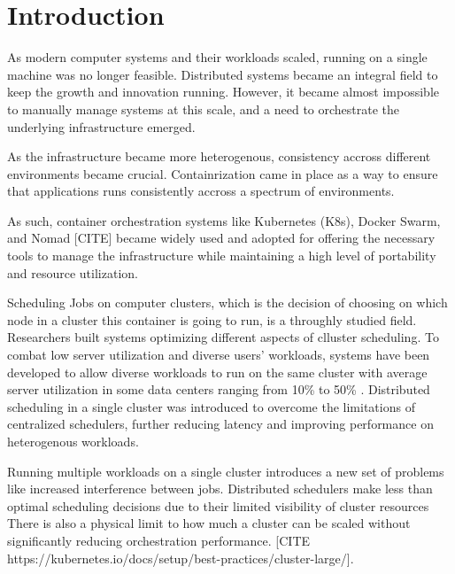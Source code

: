 
\chapter{Introduction}

As modern computer systems and their workloads scaled, running on a single
machine was no longer feasible. Distributed systems became an integral field to
keep the growth and innovation running. However, it became almost impossible to
manually manage systems at this scale, and a need to orchestrate the underlying
infrastructure emerged. 

As the infrastructure became more heterogenous, consistency accross different
environments became crucial. Containrization came in place as a way to ensure
that applications runs consistently accross a spectrum of environments. 

As such, container orchestration systems like Kubernetes (K8s), Docker Swarm,
and Nomad [CITE] became widely used and adopted for offering the necessary
tools to manage the infrastructure while maintaining a high level of portability
and resource utilization. 

Scheduling Jobs on computer clusters, which is the decision of choosing on
which node in a cluster this container is going to run, is a throughly studied
field. Researchers built systems optimizing different aspects of clluster
scheduling. To combat low server utilization and diverse users' workloads,
systems have been developed to allow diverse workloads to run on the same
cluster \cite{bhattacharya_hierarchical_2013, hindman_mesos_nodate} with
average server utilization in some data centers ranging from 10\% to 50\%
\cite{lo_heracles_2015}. Distributed scheduling in a single cluster was
introduced to overcome the limitations of centralized schedulers, further
reducing latency and improving performance on heterogenous workloads. 

Running multiple workloads on a single cluster introduces a new set of problems
like increased interference between jobs. 
Distributed schedulers make less than optimal scheduling decisions due to their
limited visibility of cluster resources
There is also a physical limit to how much a cluster can be scaled without
significantly reducing orchestration performance. [CITE
https://kubernetes.io/docs/setup/best-practices/cluster-large/].

